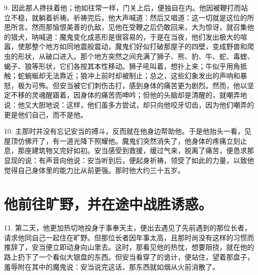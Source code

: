 9. 因此那人搀扶着他；他如往常一样，门关上后，便独自在内。他因被鞭打而站立不稳，就躺着祈祷。祈祷完后，他大声喊道：然后又唱道：这一切就是这位的所思所言。然而那恼恨美善的仇敌，见他在受鞭之后仍敢回来，大为惊讶，就召集他的猎犬，呐喊道：魔鬼变化成恶形是很容易的，于是在当夜，他们发出极大的喧嚣，使那整个地方如同地震般震动，魔鬼们好似打破那屋子的四壁，变成野兽和爬虫的形状，从破口进入。那个地方突然之间充满了狮子、熊、豹、牛、蛇、毒蝰、蝎子、狼等形状，它们各按其本性移动。狮子吼叫着，想扑上来；牛似乎用角抵触；蛇蜿蜒却无法靠近；狼冲上前时却被制止；总之，这些幻象发出的声响和暴怒，极为可怖。但安当被它们刺伤击打，感到身体的痛苦更为剧烈。然而，他以坚定不移的灵魂醒寤着，因身体的痛苦而呻吟；但他的头脑却是清醒的，就嘲弄地说：他又大胆地说：这样，他们虽多方尝试，却只向他咬牙切齿，因为他们嘲弄的更是他们自己，而不是他。\par

10. 主那时并没有忘记安当的搏斗，反而就在他身边帮助他。于是他抬头一看，见屋顶仿佛开了，有一道光降下照耀他。魔鬼们突然消失了，他身体的疼痛立刻止息，那座建筑物又完好如初。安当感受到救援，缓过气来，脱离了痛苦，便恳求那显现的说：有声音向他说：安当听到后，便起身祈祷，领受了如此的力量，以致他觉得自己身体里的能力比从前更强。那时他大约三十五岁。\par


\section{他前往旷野，并在途中战胜诱惑。}

11. 第二天，他更加热切地投身于事奉天主，便出去遇见了先前遇到的那位长者，请求他同自己一起住在旷野。但那位长者因年事太高，且那时尚没有这样的习惯而推辞了，安当便立即动身向山里去。这时，那看见他的热忱，想要阻挠，就在他的路上扔下了一个看似大银盘的东西。但安当看穿了的诡计，便站住，望着那盘子，羞辱附在其中的魔鬼说：安当说完这话，那东西就如烟从火前消散了。\par

